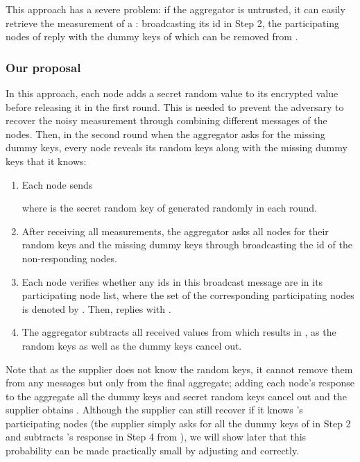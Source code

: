 \documentclass[11pt,a4paper]{article}
\theoremstyle{plain}
\theoremstyle{plain}
\theoremstyle{plain}
\theoremstyle{plain}
\theoremstyle{nonumberplain} \theoremseparator{}
\begin{document}
This approach has a severe problem: if the aggregator is untrusted, it can easily retrieve the measurement of a : broadcasting its id in Step 2, the participating nodes of  reply with the dummy keys of  which can be removed from . 


\subsubsection{Our proposal} 
\label{sec:advanced} 

In this approach, each node adds a secret random value to its encrypted value before releasing it in the first round. This is needed to prevent the adversary to recover the noisy measurement through combining different messages of the nodes. Then, in the second round when the aggregator asks for the missing dummy keys, every node reveals its random keys along with the missing dummy keys that it knows:
\begin{enumerate}
\item Each node  sends 

where  is the secret random key of  generated randomly in each round.

\item After receiving all measurements, the aggregator asks all nodes for their random keys and the missing dummy keys through broadcasting the id of the non-responding nodes. 

\item Each node  verifies whether any ids in this broadcast message are in its participating node list, where the set of the corresponding participating nodes is denoted by . Then,  replies with . 

\item The aggregator subtracts all received values from  which results in , as the random keys as well as the dummy keys cancel out. 
\end{enumerate} 

Note that as the supplier does not know the random keys, it cannot remove them from any messages but only from the final aggregate; adding each node's response to the aggregate all the dummy keys and secret random keys cancel out and the supplier obtains . 
Although
the supplier can still recover  if it knows 's participating nodes (the supplier simply asks for all the dummy keys of  in Step 2 and subtracts 's response in Step 4 from ), we will show later that this probability can be made practically small by adjusting  and  correctly.   
\end{document}
